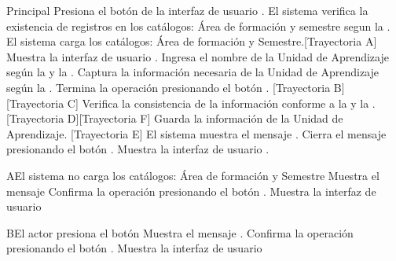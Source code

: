 \begin{UCtrayectoria}{Principal}
    \UCpaso[\UCactor] Presiona el botón \IUbutton{+} de la interfaz de usuario .
    \UCpaso El sistema verifica la existencia de registros en los catálogos: Área de formación y semestre segun la  .
    \UCpaso El sistema carga los catálogos: Área de formación y Semestre.[Trayectoria A]
    \UCpaso Muestra la interfaz de usuario .
    \UCpaso[\UCactor] Ingresa el nombre de la Unidad de Aprendizaje según la  y la .
    \UCpaso[\UCactor] Captura la información necesaria de la Unidad de Aprendizaje según la .
    \UCpaso[\UCactor] Termina la operación presionando el botón . [Trayectoria B] [Trayectoria C]
    \UCpaso Verifica la consistencia de la información conforme a la  y la . [Trayectoria D][Trayectoria F]
    \UCpaso Guarda la información de la Unidad de Aprendizaje. [Trayectoria E]
    \UCpaso El sistema muestra el mensaje .
    \UCpaso[\UCactor] Cierra el mensaje presionando el botón .
    \UCpaso Muestra la interfaz de usuario .
\end{UCtrayectoria}
\begin{UCtrayectoriaA}{A}{El sistema no carga los catálogos: Área de formación y Semestre}
	\UCpaso Muestra el mensaje 
	\UCpaso[\UCactor] Confirma la operación presionando el botón .
	 \UCpaso Muestra la interfaz de usuario 
\end{UCtrayectoriaA}
\begin{UCtrayectoriaA}{B}{El actor presiona el botón }
	\UCpaso Muestra el mensaje .
	\UCpaso[\UCactor] Confirma la operación presionando el botón .
	\UCpaso Muestra la interfaz de usuario 
\end{UCtrayectoriaA}
